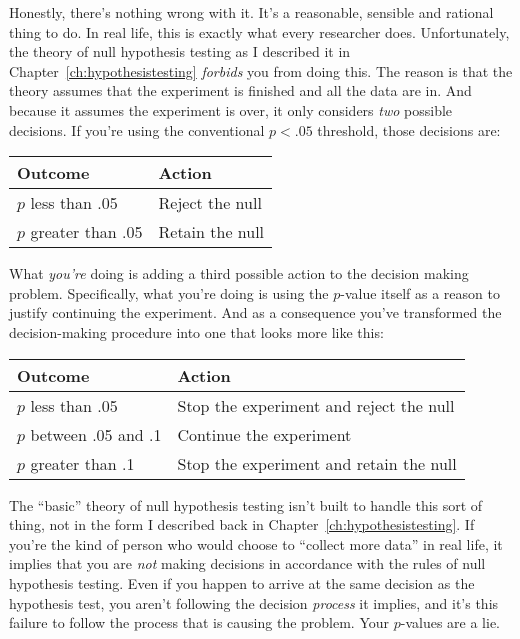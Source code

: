 Honestly, there's nothing wrong with it. It's a reasonable, sensible and rational thing to do. In real life, this is exactly what every researcher does. Unfortunately, the theory of null hypothesis testing as I described it in Chapter~\ref{ch:hypothesistesting} {\it forbids} you from doing this. The reason is that the theory assumes that the experiment is finished and all the data are in. And because it assumes the experiment is over, it only considers {\it two} possible decisions. If you're using the conventional $p<.05$ threshold, those decisions are:
\begin{center}
\begin{tabular}{l|l}
Outcome & Action \\ \hline
$p$ less than .05 & Reject the null \\
$p$ greater than .05 & Retain the null
\end{tabular}
\end{center}
What {\it you're} doing is adding a third possible action to the decision making problem. Specifically, what you're doing is using the $p$-value itself as a reason to justify continuing the experiment. And as a consequence you've transformed the decision-making procedure into one that looks more like this:
\begin{center}
\begin{tabular}{l|l}
Outcome & Action \\ \hline
$p$ less than .05 & Stop the experiment and reject the null \\
$p$ between .05 and .1 & Continue the experiment \\
$p$ greater than .1 & Stop the experiment and retain the null
\end{tabular}
\end{center}
The ``basic'' theory of null hypothesis testing isn't built to handle this sort of thing, not in the form I described back in Chapter~\ref{ch:hypothesistesting}. If you're the kind of person who would choose to ``collect more data'' in real life, it implies that you are {\it not} making decisions in accordance with the rules of null hypothesis testing. Even if you happen to arrive at the same decision as the hypothesis test, you aren't following the decision {\it process} it implies, and it's this failure to follow the process that is causing the problem. Your $p$-values are a lie.

